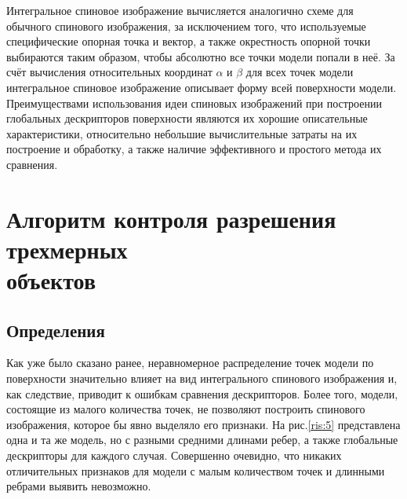 \documentclass[14pt]{article}
\numberwithin{figure}{section}
\numberwithin{equation}{section}
\begin{document}
Интегральное спиновое изображение вычисляется аналогично схеме для обычного спинового изображения, за исключением того, что используемые специфические опорная точка и вектор, а также окрестность опорной точки выбираются таким образом, чтобы абсолютно все точки модели попали в неё. За счёт вычисления относительных координат $\alpha$ и $\beta$ для всех точек модели интегральное спиновое изображение описывает форму всей поверхности модели. Преимуществами использования идеи спиновых изображений при построении глобальных дескрипторов поверхности являются их хорошие описательные характеристики, относительно небольшие вычислительные затраты на их построение и обработку, а также наличие эффективного и простого метода их сравнения.
\newpage

\section{Алгоритм контроля разрешения трехмерных \\ объектов}

\subsection{Определения}

Как уже было сказано ранее, неравномерное распределение точек модели по поверхности значительно влияет на вид интегрального спинового изображения и, как следствие, приводит к ошибкам сравнения дескрипторов. Более того, модели, состоящие из малого количества точек, не позволяют построить спинового изображения, которое бы явно выделяло его признаки. На рис.\ref{ris:5} представлена одна и та же модель, но с разными средними длинами ребер, а также глобальные дескрипторы для каждого случая. Совершенно очевидно, что никаких отличительных признаков для модели с малым количеством точек и длинными ребрами выявить невозможно.
\end{document}
